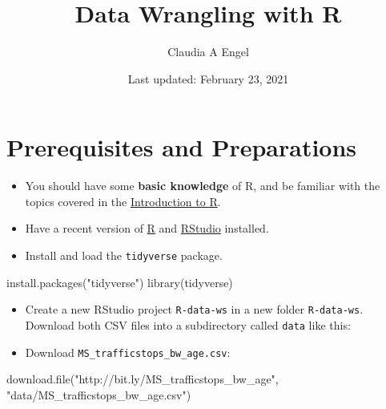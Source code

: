 \documentclass[
]{book}
\title{Data Wrangling with R}
\author{Claudia A Engel}
\date{Last updated: February 23, 2021}
\newenvironment{Shaded}{\begin{snugshade}}{\end{snugshade}}
\newcommand{\FunctionTok}[1]{\textcolor[rgb]{0.00,0.00,0.00}{#1}}
\newcommand{\NormalTok}[1]{#1}
\newcommand{\StringTok}[1]{\textcolor[rgb]{0.31,0.60,0.02}{#1}}
\providecommand{\tightlist}{%
  \setlength{\itemsep}{0pt}\setlength{\parskip}{0pt}}
\begin{document}
\maketitle

{
\setcounter{tocdepth}{1}
\tableofcontents
}
\hypertarget{prerequisites-and-preparations}{%
\chapter*{Prerequisites and Preparations}\label{prerequisites-and-preparations}}

\begin{itemize}
\tightlist
\item
  You should have some \textbf{basic knowledge} of R, and be familiar with the topics covered in the \href{https://cengel.github.io/R-intro/}{Introduction to R}.
\item
  Have a recent version of \href{https://cran.r-project.org/}{R} and \href{https://www.rstudio.com/}{RStudio} installed.
\item
  Install and load the \texttt{tidyverse} package.
\end{itemize}

\begin{Shaded}
\begin{Highlighting}[]
\FunctionTok{install.packages}\NormalTok{(}\StringTok{"tidyverse"}\NormalTok{)  }
\FunctionTok{library}\NormalTok{(tidyverse)}
\end{Highlighting}
\end{Shaded}

\begin{itemize}
\tightlist
\item
  Create a new RStudio project \texttt{R-data-ws} in a new folder \texttt{R-data-ws}. Download both CSV files into a subdirectory called \texttt{data} like this:
\item
  Download \texttt{MS\_trafficstops\_bw\_age.csv}:
\end{itemize}

\begin{Shaded}
\begin{Highlighting}[]
\FunctionTok{download.file}\NormalTok{(}\StringTok{"http://bit.ly/MS\_trafficstops\_bw\_age"}\NormalTok{,}
              \StringTok{"data/MS\_trafficstops\_bw\_age.csv"}\NormalTok{)}
\end{Highlighting}
\end{Shaded}
\end{document}
